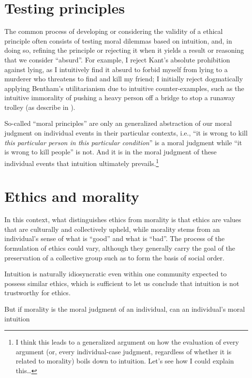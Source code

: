 \documentclass{scrartcl}
\begin{document}
\section{Testing principles}

The common process of developing or considering the validity of a ethical principle often consists of testing moral dilemmas based on intuition, and, in doing so, refining the principle or rejecting it when it yields a result or reasoning that we consider ``absurd''. For example, I reject Kant's absolute prohibition against lying, as I intuitively find it absurd to forbid myself from lying to a murderer who threatens to find and kill my friend; I initially reject dogmatically applying Bentham's utilitarianism due to intuitive counter-examples, such as the intuitive immorality of pushing a heavy person off a bridge to stop a runaway trolley (as describe in \autocite[21]{justice}).

So-called ``moral principles'' are only an generalized abstraction of our moral judgment on individual events in their particular contexts, i.e., ``it is wrong to kill \emph{this particular person in this particular condition}'' is a moral judgment while ``it is wrong to kill people'' is not. And it is in the moral judgment of these individual events that intuition ultimately prevails.\footnote{I think this leads to a generalized argument on how the evaluation of every argument (or, every individual-case judgment, regardless of whether it is related to morality) boils down to intuition. Let's see how I could explain this\ldots{}}
 
\section{Ethics and morality}

In this context, what distinguishes ethics from morality is that ethics are values that are culturally and collectively upheld, while morality stems from an individual's sense of what is ``good'' and what is ``bad''. The process of the formulation of ethics could vary, although they generally carry the goal of the preservation of a collective group such as to form the basis of social order.

Intuition is naturally idiosyncratic even within one community expected to possess similar ethics, which is sufficient to let us conclude that intuition is not trustworthy for ethics.

But if morality is the moral judgment of an individual, can an individual's moral intuition

\printbibliography
\end{document}
